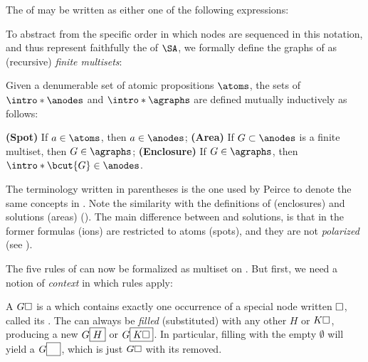 \begin{example}
The  of  may be written as either one of the
following expressions:
\end{example}

To abstract from the specific order in which nodes are sequenced in this
notation, and thus represent faithfully the  of $\SA$, we formally
define the graphs of  as (recursive) \emph{finite multisets}:

\begin{scope}

\begin{definition}[Graph] 
  
  Given a denumerable set of atomic propositions $\atoms$, the sets of
   $\intro*\anodes$ and 
  $\intro*\agraphs$ are defined mutually inductively as follows:
  \begin{itemize}
    \itemAP \textbf{(Spot)} If $a \in \atoms$, then $a \in \anodes$;
    \itemAP \textbf{(Area)} If $G \subset \anodes$ is a finite multiset, then $G
    \in \agraphs$;
    \itemAP \textbf{(Enclosure)} If $G \in \agraphs$, then $\intro*\bcut{G} \in
    \anodes$.
  \end{itemize}
\end{definition}
The terminology written in parentheses is the one used by Peirce to denote the
same concepts in . Note the similarity with
the definitions of  (enclosures) and solutions (areas)
(). The main difference between  and solutions,
is that in the former formulas (ions) are restricted to atoms (spots), and they
are not \emph{polarized} (see ).

The five rules of  can now be formalized as multiset 
on . But first, we need a notion of \emph{context} in which rules
apply:

\begin{definition}[Context]
  A  $G\square$ is a  which contains exactly one
  occurrence of a special node written $\square$, called its . The
   can always be \emph{filled} (substituted) with any other 
  $H$ or  $K\square$, producing a new  $G\fbox{$H$}$ or 
  $G\fbox{$K\square$}$. In particular, filling with the empty 
  $\emptyset$ will yield a  $G\fbox{$\phantom{G}$}$, which is just
  $G\square$ with its  removed.
\end{definition}


\end{scope}
